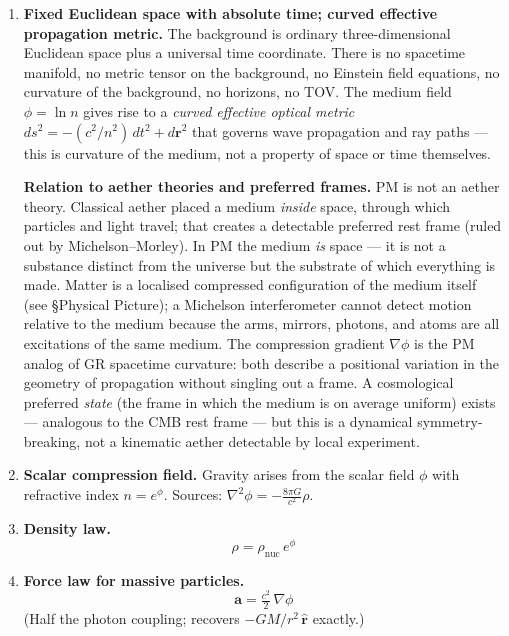 \documentclass[10pt,twocolumn]{article}
\begin{document}
\begin{enumerate}\setlength{\itemsep}{2pt}
  \item \textbf{Fixed Euclidean space with absolute time; curved effective propagation metric.}
        The background is ordinary three-dimensional Euclidean space plus a
        universal time coordinate.  There is no spacetime manifold, no metric
        tensor on the background, no Einstein field equations, no curvature of
        the background, no horizons, no TOV.
        The medium field $\phi = \ln n$ gives rise to a \emph{curved effective
        optical metric} $ds^2 = -(c^2/n^2)\,dt^2 + d\mathbf{r}^2$ that governs
        wave propagation and ray paths — this is curvature of the medium, not a
        property of space or time themselves.

        \textbf{Relation to aether theories and preferred frames.}
        PM is not an aether theory.  Classical aether placed a medium
        \emph{inside} space, through which particles and light travel; that
        creates a detectable preferred rest frame (ruled out by Michelson--Morley).
        In PM the medium \emph{is} space — it is not a substance distinct from
        the universe but the substrate of which everything is made.
        Matter is a localised compressed configuration of the medium itself
        (see §Physical Picture); a Michelson interferometer cannot detect motion
        relative to the medium because the arms, mirrors, photons, and atoms are
        all excitations of the same medium.  The compression gradient $\nabla\phi$
        is the PM analog of GR spacetime curvature: both describe a positional
        variation in the geometry of propagation without singling out a frame.
        A cosmological preferred \emph{state} (the frame in which the medium is
        on average uniform) exists — analogous to the CMB rest frame — but this
        is a dynamical symmetry-breaking, not a kinematic aether detectable by
        local experiment.

  \item \textbf{Scalar compression field.}
        Gravity arises from the scalar field $\phi$ with refractive index
        $n=e^{\phi}$.  Sources: $\nabla^2\phi = -\tfrac{8\pi G}{c^2}\rho$.

  \item \textbf{Density law.}
        \[ \rho = \rho_{\mathrm{nuc}}\,e^{\phi} \]

  \item \textbf{Force law for massive particles.}
        \[ \mathbf{a} = \tfrac{c^2}{2}\,\nabla\phi \]
        (Half the photon coupling; recovers $-GM/r^2\,\hat{\mathbf{r}}$ exactly.)


\end{enumerate}
\end{document}
